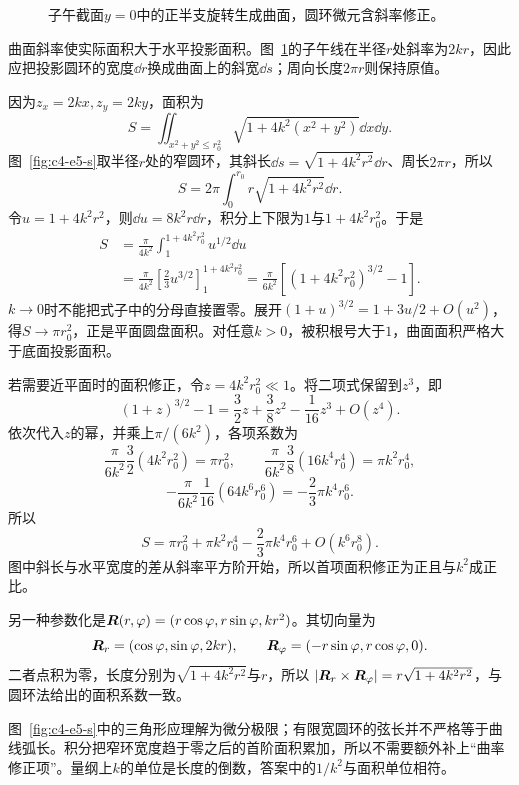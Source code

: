 \begin{figure}[H]\centering
{}
\caption{子午截面$y=0$中的正半支旋转生成曲面，圆环微元含斜率修正。}\label{fig:c4-e5-q}
\end{figure}
\begin{solution}
曲面斜率使实际面积大于水平投影面积。图~\ref{fig:c4-e5-q}的子午线在半径$r$处斜率为$2kr$，因此应把投影圆环的宽度$\dd r$换成曲面上的斜宽$\dd s$；周向长度$2\pi r$则保持原值。


因为$z_x=2kx,z_y=2ky$，面积为
\[S=\iint_{x^2+y^2\le r_0^2}\sqrt{1+4k^2(x^2+y^2)}\dd x\dd y.
\]
图~\ref{fig:c4-e5-s}取半径$r$处的窄圆环，其斜长$\dd s=\sqrt{1+4k^2r^2}\dd r$、周长$2\pi r$，所以
\[S=2\pi\int_0^{r_0}r\sqrt{1+4k^2r^2}\dd r.\]
令$u=1+4k^2r^2$，则$\dd u=8k^2r\dd r$，积分上下限为$1$与$1+4k^2r_0^2$。于是
\[\begin{aligned}
S&=\frac\pi{4k^2}\int_1^{1+4k^2r_0^2}u^{1/2}\dd u\\
&=\frac\pi{4k^2}\left[\frac23u^{3/2}\right]_1^{1+4k^2r_0^2}
=\boxed{\frac\pi{6k^2}[(1+4k^2r_0^2)^{3/2}-1]}.
\end{aligned}\]
$k\to0$时不能把式子中的分母直接置零。展开$(1+u)^{3/2}=1+3u/2+O(u^2)$，得$S\to\pi r_0^2$，正是平面圆盘面积。对任意$k>0$，被积根号大于$1$，曲面面积严格大于底面投影面积。


若需要近平面时的面积修正，令$z=4k^2r_0^2\ll1$。将二项式保留到$z^3$，即
\[
 (1+z)^{3/2}-1=\frac32z+\frac38z^2-\frac1{16}z^3+O(z^4).
\]
依次代入$z$的幂，并乘上$\pi/(6k^2)$，各项系数为
\[
 \frac{\pi}{6k^2}\frac32(4k^2r_0^2)=\pi r_0^2,\qquad
 \frac{\pi}{6k^2}\frac38(16k^4r_0^4)=\pi k^2r_0^4,
\]
\[
 -\frac{\pi}{6k^2}\frac1{16}(64k^6r_0^6)
 =-\frac23\pi k^4r_0^6.
\]
所以
\[S=\pi r_0^2+\pi k^2r_0^4-\frac23\pi k^4r_0^6+O(k^6r_0^8).\]
图中斜长与水平宽度的差从斜率平方阶开始，所以首项面积修正为正且与$k^2$成正比。

另一种参数化是$\bm{R}(r,\varphi)=(r\cos\varphi,r\sin\varphi,kr^2)$。其切向量为
\[\bm{R}_r=(\cos\varphi,\sin\varphi,2kr),\qquad
\bm{R}_\varphi=(-r\sin\varphi,r\cos\varphi,0).\]
二者点积为零，长度分别为$\sqrt{1+4k^2r^2}$与$r$，所以
$|\bm{R}_r\times\bm{R}_\varphi|=r\sqrt{1+4k^2r^2}$，与圆环法给出的面积系数一致。

图~\ref{fig:c4-e5-s}中的三角形应理解为微分极限；有限宽圆环的弦长并不严格等于曲线弧长。积分把窄环宽度趋于零之后的首阶面积累加，所以不需要额外补上“曲率修正项”。量纲上$k$的单位是长度的倒数，答案中的$1/k^2$与面积单位相符。


\end{solution}
